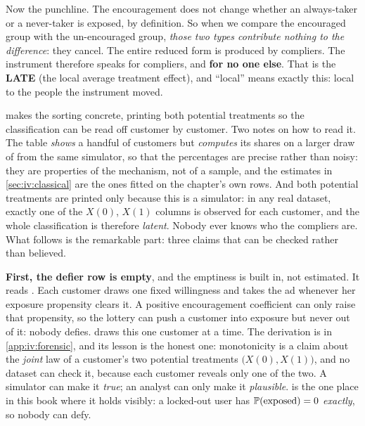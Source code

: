 Now the punchline. The encouragement does not change whether an always-taker or a never-taker is
exposed, by definition. So when we compare the encouraged group with the un-encouraged group,
\emph{those two types contribute nothing to the difference}: they cancel. The entire reduced form
is produced by compliers. The instrument therefore speaks for compliers, and \textbf{for no one
else}. That is the \textbf{LATE} (the local average treatment effect), and ``local'' means
exactly this: local to the people the instrument moved.

 makes the sorting concrete, printing both potential treatments so the
classification can be read off customer by customer. Two notes on how to read it. The table
\emph{shows} a handful of customers but \emph{computes} its shares on a larger draw of
\nbElevenStN{} from the same simulator, so that the percentages are precise rather than noisy:
they are properties of the mechanism, not of a sample, and the estimates in \cref{sec:iv:classical}
are the ones fitted on the chapter's own \nbElevenN{} rows. And both potential treatments are
printed only because this is a simulator: in any real dataset, exactly one of the $X(0)$, $X(1)$
columns is observed for each customer, and the whole classification is therefore \emph{latent}.
Nobody ever knows who the compliers are. What follows is the remarkable part: three claims that
can be checked rather than believed.



\textbf{First, the defier row is empty}, and the emptiness is built in, not estimated. It reads
\pc{\nbElevenStShareDefier}. Each customer draws one fixed willingness and takes the ad whenever her
exposure propensity clears it. A positive encouragement coefficient can only raise that propensity,
so the lottery can push a customer into exposure but never out of it: nobody defies.
 draws this one customer at a time. The derivation is in
\cref{app:iv:forensic}, and its lesson is the honest one: monotonicity is a claim about the
\emph{joint} law of a customer's two potential treatments $\big(X(0), X(1)\big)$, and no dataset can
check it, because each customer reveals only one of the two. A simulator can make it \emph{true}; an
analyst can only make it \emph{plausible}.  is the one place in this book where it
holds visibly: a locked-out user has $\operatorname{\mathbb{P}}(\text{exposed}) = 0$ \emph{exactly}, so nobody can defy.



